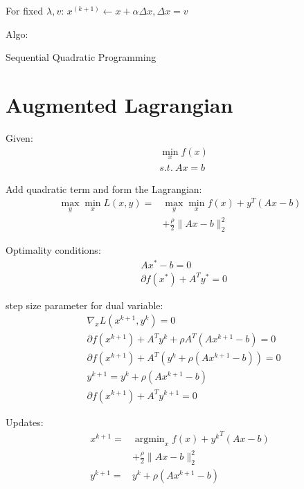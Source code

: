 \documentclass[8pt]{report}
\DeclareMathOperator*{\argmin}{argmin}
\newcommand{\norm}[1]{\|#1\|}
\begin{document}
\begin{multicols*}{2}
  For fixed $\lambda, v$: $x^{(k+1)} \leftarrow x + \alpha \Delta x, \Delta x = v$
  
  Algo:\\
  \begin{algorithm}[H]
    \caption{Sequential Quadratic Programming\label{algo:SQP}}
  \end{algorithm}
  
  \vfill\null
  
  \pagebreak

  \section{Augmented Lagrangian}

  Given:
  \begin{align*}
    & \min_x f(x)\\
    & s.t.\ Ax = b
  \end{align*}

  Add quadratic term and form the Lagrangian:
  \begin{align*}
    \max_y \min_x L(x,y) = & \max_y \min_x f(x) + y^T(Ax-b)\\
                           & + \frac{\rho}{2}\norm{Ax-b}_2^2
  \end{align*}

  Optimality conditions:
  \begin{align*}
    & Ax^* - b = 0\\
    & \partial f(x^*) + A^Ty^* = 0
  \end{align*}

  step size parameter for dual variable:
  \begin{align*}
    &\nabla_x L(x^{k+1},y^k) = 0\\
    &\partial f(x^{k+1}) + A^T y^k + \rho A^T(Ax^{k+1}-b)=0\\
    &\partial f(x^{k+1}) + A^T( y^k + \rho(Ax^{k+1}-b))=0\\
    &y^{k+1} = y^k + \rho(Ax^{k+1}-b)\\
    &\partial f(x^{k+1}) + A^T y^{k+1}=0
  \end{align*}
  
  Updates:
  \begin{align*}
    x^{k+1} = & \argmin_x f(x) + {y^{k}}^T(Ax-b)\\
                           & + \frac{\rho}{2}\norm{Ax-b}_2^2\\
    y^{k+1} = & y^k + \rho(Ax^{k+1}-b)
  \end{align*}


\end{multicols*}
\end{document}
